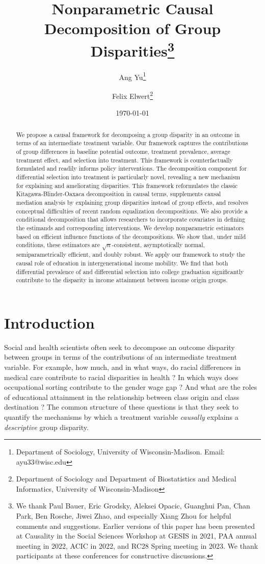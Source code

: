 \documentclass[12pt,a4paper]{article}
\title{\Large Nonparametric Causal Decomposition of Group Disparities\thanks{We thank Paul Bauer, Eric Grodsky, Aleksei Opacic, Guanghui Pan, Chan Park, Ben Rosche, Jiwei Zhao, and especially Xiang Zhou for helpful comments and suggestions. Earlier versions of this paper has been presented at Causality in the Social Sciences Workshop at GESIS in 2021, PAA annual meeting in 2022, ACIC in 2022, and RC28 Spring meeting in 2023. We thank participants at these conferences for constructive discussions.}}
\author{\large Ang Yu\thanks{Department of Sociology, University of Wisconsin-Madison. Email: ayu33@wisc.edu} \and Felix Elwert\thanks{Department of Sociology and Department of Biostatistics and Medical Informatics, University of Wisconsin-Madison}}
\date{\large \today}
\begin{document}
\maketitle

\begin{abstract}
We propose a causal framework for decomposing a group disparity in an outcome in terms of an intermediate treatment variable. Our framework captures the contributions of group differences in baseline potential outcome, treatment prevalence, average treatment effect, and selection into treatment. This framework is counterfactually formulated and readily informs policy interventions. The decomposition component for differential selection into treatment is particularly novel, revealing a new mechanism for explaining and ameliorating disparities. This framework reformulates the classic Kitagawa-Blinder-Oaxaca decomposition in causal terms, supplements causal mediation analysis by explaining group disparities instead of group effects, and resolves conceptual difficulties of recent random equalization decompositions. We also provide a conditional decomposition that allows researchers to incorporate covariates in defining the estimands and corresponding interventions. We develop nonparametric estimators based on efficient influence functions of the decompositions. We show that, under mild conditions, these estimators are $\sqrt{n}$-consistent, asymptotically normal, semiparametrically efficient, and doubly robust. We apply our framework to study the causal role of education in intergenerational income mobility. We find that both differential prevalence of and differential selection into college graduation significantly contribute to the disparity in income attainment between income origin groups.
\end{abstract}

\section{Introduction}
Social and health scientists often seek to decompose an outcome disparity between groups in terms of the contributions of an intermediate treatment variable. 
For example, how much, and in what ways, do racial differences in medical care contribute to racial disparities in health \citep{bosworth_racial_2006,howe_african_2014}? In which ways does occupational sorting contribute to the gender wage gap \citep{petersen_separate_1995,blau_gender_2017}? And what are the roles of educational attainment in the relationship between class origin and class destination \citep{ishida_class_1995, breen_educational_2010}? 
The common structure of these questions is that they seek to quantify the mechanisms by which a treatment variable \emph{causally} explains a \emph{descriptive} group disparity. 
\end{document}
